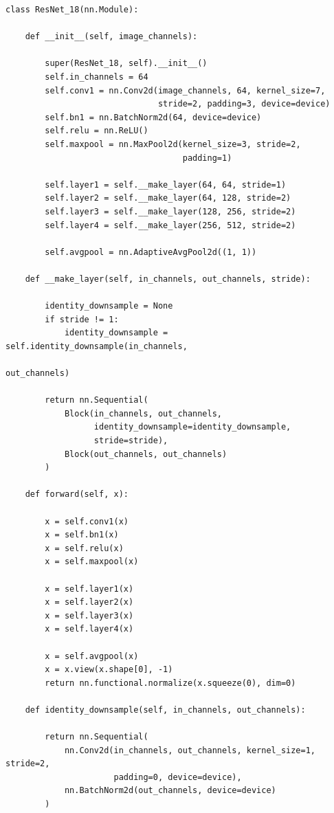 \pagebreak 

\begin{lstlisting}[style=mypython, xleftmargin=.03\textwidth, xrightmargin=.03\textwidth]
class ResNet_18(nn.Module):
    
    def __init__(self, image_channels):
        
        super(ResNet_18, self).__init__()
        self.in_channels = 64
        self.conv1 = nn.Conv2d(image_channels, 64, kernel_size=7, 
                               stride=2, padding=3, device=device)
        self.bn1 = nn.BatchNorm2d(64, device=device)
        self.relu = nn.ReLU()
        self.maxpool = nn.MaxPool2d(kernel_size=3, stride=2, 
                                    padding=1)
        
        self.layer1 = self.__make_layer(64, 64, stride=1)
        self.layer2 = self.__make_layer(64, 128, stride=2)
        self.layer3 = self.__make_layer(128, 256, stride=2)
        self.layer4 = self.__make_layer(256, 512, stride=2)
        
        self.avgpool = nn.AdaptiveAvgPool2d((1, 1))
        
    def __make_layer(self, in_channels, out_channels, stride):
        
        identity_downsample = None
        if stride != 1:
            identity_downsample = self.identity_downsample(in_channels, 
                                                           out_channels)
            
        return nn.Sequential(
            Block(in_channels, out_channels, 
                  identity_downsample=identity_downsample, 
                  stride=stride), 
            Block(out_channels, out_channels)
        )
        
    def forward(self, x):
        
        x = self.conv1(x)
        x = self.bn1(x)
        x = self.relu(x)
        x = self.maxpool(x)
        
        x = self.layer1(x)
        x = self.layer2(x)
        x = self.layer3(x)
        x = self.layer4(x)
        
        x = self.avgpool(x)
        x = x.view(x.shape[0], -1)
        return nn.functional.normalize(x.squeeze(0), dim=0)
    
    def identity_downsample(self, in_channels, out_channels):
        
        return nn.Sequential(
            nn.Conv2d(in_channels, out_channels, kernel_size=1, stride=2, 
                      padding=0, device=device), 
            nn.BatchNorm2d(out_channels, device=device)
        )
\end{lstlisting}

